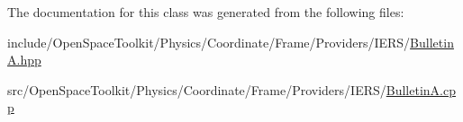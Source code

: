 The documentation for this class was generated from the following files\+:\begin{DoxyCompactItemize}
\item 
include/\+Open\+Space\+Toolkit/\+Physics/\+Coordinate/\+Frame/\+Providers/\+I\+E\+R\+S/\hyperlink{_bulletin_a_8hpp}{Bulletin\+A.\+hpp}\item 
src/\+Open\+Space\+Toolkit/\+Physics/\+Coordinate/\+Frame/\+Providers/\+I\+E\+R\+S/\hyperlink{_bulletin_a_8cpp}{Bulletin\+A.\+cpp}\end{DoxyCompactItemize}
